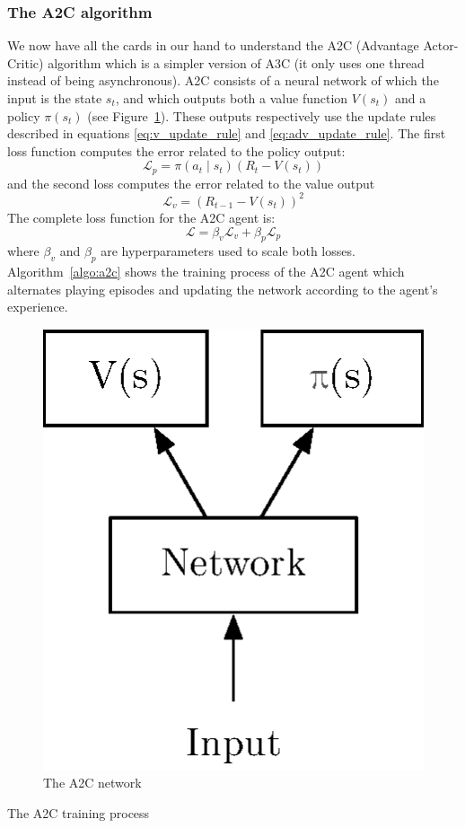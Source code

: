 \subsubsection{The A2C algorithm}
We now have all the cards in our hand to understand the A2C
(Advantage Actor-Critic) algorithm which is a simpler version of A3C \cite{a3c}
(it only uses one thread instead of being asynchronous). 
A2C consists of a neural network
of which the input is the state $s_t$, and which outputs both a value function
$V(s_t)$ and a policy $\pi(s_t)$ (see Figure~\ref{fig:a2c}). These outputs
respectively use the update rules described in equations \ref{eq:v_update_rule}
and \ref{eq:adv_update_rule}. The first loss function computes the error
related to the policy output:
$$ \mathcal{L}_p = \pi(a_t \mid s_t) (R_t - V(s_t))$$
and the second loss computes the error related to the value output
$$ \mathcal{L}_v = (R_{t-1} - V(s_t))^2$$
The complete loss function for the A2C agent is:
$$ \mathcal{L} = \beta_v \mathcal{L}_v + \beta_p \mathcal{L}_p $$
where $\beta_v$ and $\beta_p$ are hyperparameters used to scale both losses.\\

Algorithm~\ref{algo:a2c} shows the training
process of the A2C agent which alternates playing episodes and updating the
network according to the agent's experience.

\begin{figure}[]
	\centering
	\includegraphics[width=0.2\linewidth]{fig/a3c.eps}
	\caption{The A2C network}
	\label{fig:a2c}
\end{figure}

\begin{algorithm}
\caption{The A2C training process}
\label{algo:a2c}
\begin{algorithmic}[1]
	\Statex
	\EndWhile
	\Statex
	\EndFor
	\Statex
\EndWhile

\end{algorithmic}
\end{algorithm}

